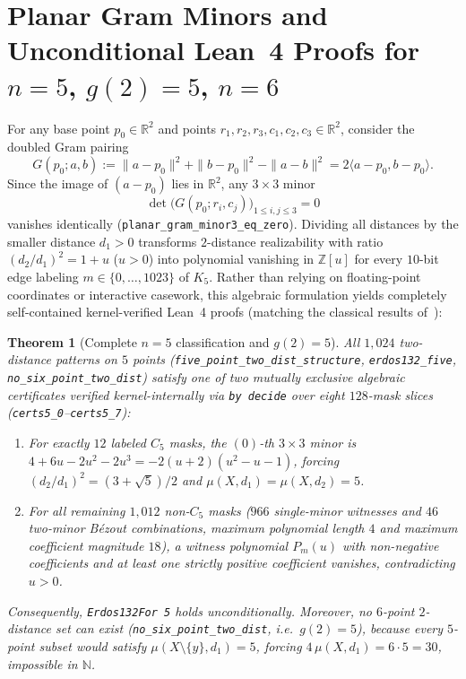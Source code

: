 \documentclass[11pt,reqno]{amsart}
\newtheorem{theorem}{Theorem}[section]
\theoremstyle{definition}
\newcommand{\R}{\mathbb{R}}
\newcommand{\Z}{\mathbb{Z}}
\newcommand{\N}{\mathbb{N}}
\begin{document}
\section{Planar Gram Minors and Unconditional Lean~4 Proofs for \texorpdfstring{$n = 5$, $g(2) = 5$, $n = 6$}{n = 5, g(2) = 5, n = 6}}

For any base point $p_0 \in \R^2$ and points $r_1, r_2, r_3, c_1, c_2, c_3 \in \R^2$, consider the doubled Gram pairing
\[
G(p_0; a, b) := \|a - p_0\|^2 + \|b - p_0\|^2 - \|a - b\|^2 = 2\langle a - p_0, b - p_0 \rangle.
\]
Since the image of $(a - p_0)$ lies in $\R^2$, any $3 \times 3$ minor
\[
\det\bigl(G(p_0; r_i, c_j)\bigr)_{1 \le i,j \le 3} = 0
\]
vanishes identically (\texttt{planar\_gram\_minor3\_eq\_zero}). Dividing all distances by the smaller distance $d_1 > 0$ transforms $2$-distance realizability with ratio $(d_2 / d_1)^2 = 1 + u$ ($u > 0$) into polynomial vanishing in $\Z[u]$ for every $10$-bit edge labeling $m \in \{0, \dots, 1023\}$ of $K_5$. Rather than relying on floating-point coordinates or interactive casework, this algebraic formulation yields completely self-contained kernel-verified Lean~4 proofs (matching the classical results of~\cite{ErFi95}):

\begin{theorem}[Complete $n = 5$ classification and $g(2) = 5$]\label{thm:n5}
All $1,024$ two-distance patterns on $5$ points (\texttt{five\_point\_two\_dist\_structure}, \texttt{erdos132\_five}, \texttt{no\_six\_point\_two\_dist}) satisfy one of two mutually exclusive algebraic certificates verified kernel-internally via \texttt{by decide} over eight $128$-mask slices (\texttt{certs5\_0}--\texttt{certs5\_7}):
\begin{enumerate}
  \item For exactly $12$ labeled $C_5$ masks, the $(0)$-th $3\times 3$ minor is $4 + 6u - 2u^2 - 2u^3 = -2(u+2)(u^2 - u - 1)$, forcing $(d_2/d_1)^2 = (3+\sqrt{5})/2$ and $\mu(X, d_1) = \mu(X, d_2) = 5$.
  \item For all remaining $1,012$ non-$C_5$ masks ($966$ single-minor witnesses and $46$ two-minor B\'ezout combinations, maximum polynomial length $4$ and maximum coefficient magnitude $18$), a witness polynomial $P_m(u)$ with non-negative coefficients and at least one strictly positive coefficient vanishes, contradicting $u > 0$.
\end{enumerate}
Consequently, \texttt{Erdos132For 5} holds unconditionally. Moreover, no $6$-point $2$-distance set can exist (\texttt{no\_six\_point\_two\_dist}, i.e.\ $g(2) = 5$), because every $5$-point subset would satisfy $\mu(X \setminus \{y\}, d_1) = 5$, forcing $4\,\mu(X, d_1) = 6 \cdot 5 = 30$, impossible in $\N$.
\end{theorem}
\end{document}
